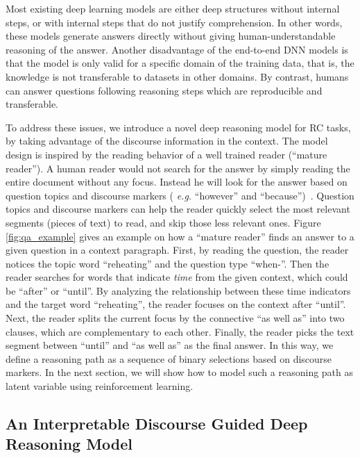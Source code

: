 Most existing deep learning models are either deep structures without internal steps, or with internal steps that do not justify comprehension. In other words, these models generate answers directly without giving human-understandable reasoning of the answer. Another disadvantage of the end-to-end DNN models is that the model is only valid for a specific domain of the training data, that is, the knowledge is not transferable to datasets in other domains. %
By contrast, humans can answer questions following reasoning steps which are reproducible and transferable.  

To address these issues, we introduce a novel deep reasoning model for RC tasks, by taking advantage of the discourse information in the context. The model design is inspired by the reading behavior of a well trained reader (``mature reader''). A human reader would not search for the answer by simply reading the entire document without any focus. Instead he will look for the answer based on question topics and discourse markers ( \emph{e.g.} ``however'' and ``because'')~\cite{assiri2011test,sungatullina2016metacognitive}. Question topics and discourse markers can help the reader quickly select the most relevant segments (pieces of text) to read, and skip those less relevant ones. Figure \ref{fig:qa_example} gives an example on how a ``mature reader'' finds an answer to a given question in a context paragraph. First, by reading the question, the reader notices the topic word ``reheating'' and the question type ``when-''. Then the reader searches for words that indicate \emph{time} from the given context, which could be ``after'' or ``until''. By analyzing the relationship between these time indicators and the target word ``reheating'', the reader focuses on the context after ``until''. Next, the reader splits the current focus by the connective ``as well as'' into two clauses, which are complementary to each other. Finally, the reader picks the text segment between ``until'' and ``as well as'' as the final answer. In this way, we define a reasoning path as a sequence of binary selections based on discourse markers. In the next section, we will show how to model such a reasoning path as latent variable using reinforcement learning.


\subsection{An Interpretable Discourse Guided Deep Reasoning Model}

